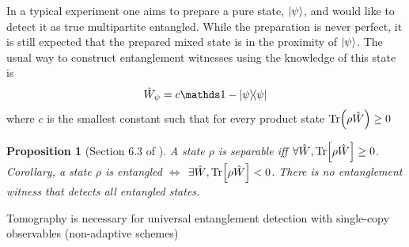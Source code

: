 \documentclass[
aps,
pra,
floatfix,
]{revtex4-2}
\theoremstyle{plain}
\newtheorem{proposition}{Proposition}
\theoremstyle{definition}
\newcommand{\ew}{\hat{W}}
\newcommand{\dm}{\rho}
\begin{document}
In a typical experiment one aims to prepare a pure state, $\ket{\psi}$, and would like to detect it as true multipartite entangled. 
While the preparation is never perfect, it is still expected that the prepared mixed state is in the proximity of $\ket{\psi}$. The usual way to construct entanglement witnesses using the knowledge of this state is
\begin{equation}
	\ew_{\psi} = c\identity - \op{\psi} 
	\label{eq:entanglement_witness}
\end{equation}
where $c$ is the smallest constant such that for every product state $\Tr(\dm\ew)\ge 0$
\begin{proposition}[Section 6.3 of \cite{heinosaariMathematicalLanguageQuantum2011}]
	A state $\dm$ is separable iff $\forall \ew,\Tr[\dm \ew]\ge 0$. 
	Corollary, a state $\dm$ is entangled $\iff$  $\exists \ew,\Tr[\dm \ew]<0$. 
	There is no entanglement witness that detects all entangled states.
\end{proposition}
Tomography is necessary for universal entanglement detection with single-copy observables (non-adaptive schemes)
\cite{luTomographyNecessaryUniversal2016}
\end{document}

